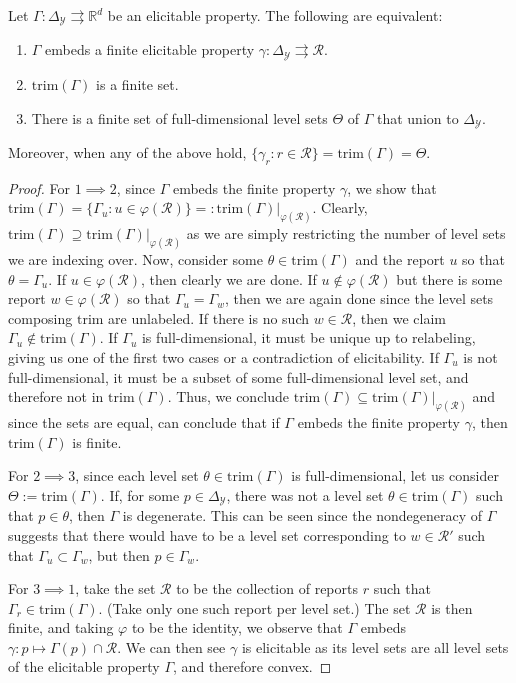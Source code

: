 \documentclass[11pt]{colt2019}
\newcommand{\reals}{\mathbb{R}}
\newcommand{\simplex}{\Delta_\Y}
\newcommand{\R}{\mathcal{R}}
\newcommand{\Y}{\mathcal{Y}}
\newcommand{\toto}{\rightrightarrows}
\newcommand{\trim}{\mathrm{trim}}
\begin{document}
\begin{proposition}\label{prop:embed-trim}
  Let $\Gamma:\simplex\toto\reals^d$ be an elicitable property.
  The following are equivalent:
  \begin{enumerate}
  \item $\Gamma$ embeds a finite elicitable property $\gamma:\simplex \toto \R$.
  \item $\trim(\Gamma)$ is a finite set.
  \item There is a finite set of full-dimensional level sets $\Theta$ of $\Gamma$ that union to $\simplex$.
  \end{enumerate}
  Moreover, when any of the above hold, $\{\gamma_r : r\in\R\} = \trim(\Gamma) = \Theta$.
\end{proposition}
\begin{proof}
  For $1 \implies 2$, since $\Gamma$ embeds the finite property $\gamma$, we show that $\trim(\Gamma) = \{\Gamma_u : u \in \varphi(\R)\} =: \trim(\Gamma)|_{\varphi(\R)}$.
  Clearly, $\trim(\Gamma) \supseteq \trim(\Gamma)|_{\varphi(\R)}$ as we are simply restricting the number of level sets we are indexing over.
  Now, consider some $\theta \in \trim(\Gamma)$ and the report $u$ so that $\theta = \Gamma_u$.
  If $u \in \varphi(\R)$, then clearly we are done.
  If $u \not\in \varphi(\R)$ but there is some report $w \in \varphi(\R)$ so that $\Gamma_u = \Gamma_w$, then we are again done since the level sets composing $\trim$ are unlabeled.
  If there is no such $w \in \R$, then we claim $\Gamma_u \not \in \trim(\Gamma)$.
  If $\Gamma_u$ is full-dimensional, it must be unique up to relabeling, giving us one of the first two cases or a contradiction of elicitability.
  If $\Gamma_u$ is not full-dimensional, it must be a subset of some full-dimensional level set, and therefore not in $\trim(\Gamma)$.
  Thus, we conclude $\trim(\Gamma) \subseteq \trim(\Gamma)|_{\varphi(\R)}$ and since the sets are equal, can conclude that if $\Gamma$ embeds the finite property $\gamma$, then $\trim(\Gamma)$ is finite.
  
  For $2 \implies 3$, since each level set $\theta \in \trim(\Gamma)$ is full-dimensional, let us consider $\Theta := \trim(\Gamma)$.
  If, for some $p \in \simplex$, there was not a level set $\theta \in \trim(\Gamma)$ such that $p \in \theta$, then $\Gamma$ is degenerate.
  This can be seen since the nondegeneracy of $\Gamma$ suggests that there would have to be a level set corresponding to $w \in \R'$ such that $\Gamma_u \subset \Gamma_w$, but then $p \in \Gamma_w$.
  
  For $3 \implies 1$, take the set $\R$ to be the collection of reports $r$ such that $\Gamma_r \in\trim(\Gamma)$.
  (Take only one such report per level set.)
  The set $\R$ is then finite, and taking $\varphi$ to be the identity, we observe that $\Gamma$ embeds $\gamma: p \mapsto \Gamma(p) \cap \R$.
  We can then see $\gamma$ is elicitable as its level sets are all level sets of the elicitable property $\Gamma$, and therefore convex.
\end{proof}
\end{document}

